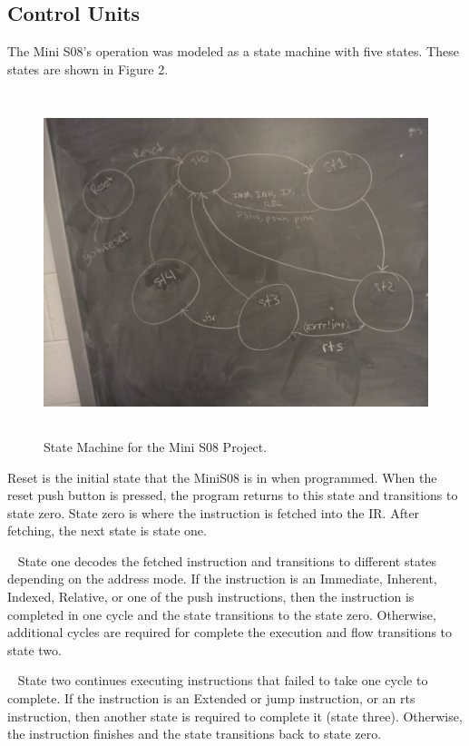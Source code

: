 \documentclass[letterpaper, 12pt]{article}
\begin{document}
\begin{flushleft}
\section*{Control Units}
The Mini S08's operation was modeled as a state machine with five states.  These states are shown in Figure 2.
 \begin{figure}[H]
 	\centering
	\includegraphics[width=\linewidth,height=10cm,keepaspectratio]{s08_states.jpg}
	\caption[Mini S08 State Machine Diagram]{State Machine for the Mini S08 Project.}
	\label{fig:arch}
\end{figure}

\newpage
Reset is the initial state that the MiniS08 is in when programmed.  When the reset push button is pressed, the program returns to this state and transitions to state zero. State zero is where the instruction is fetched into the IR.  After fetching, the next state is state one.

~\newline
State one decodes the fetched instruction and transitions to different states depending on the address mode.  If the instruction is an Immediate, Inherent, Indexed, Relative, or one of the push instructions, then the instruction is completed in one cycle and the state transitions to the state zero.  Otherwise, additional cycles are required for complete the execution and flow transitions to state two.

~\newline
State two continues executing instructions that failed to take one cycle to complete.  If the instruction is an Extended or jump instruction, or an rts instruction, then another state is required to complete it (state three).  Otherwise, the instruction finishes and the state transitions back to state zero.


\end{flushleft}
\end{document}
